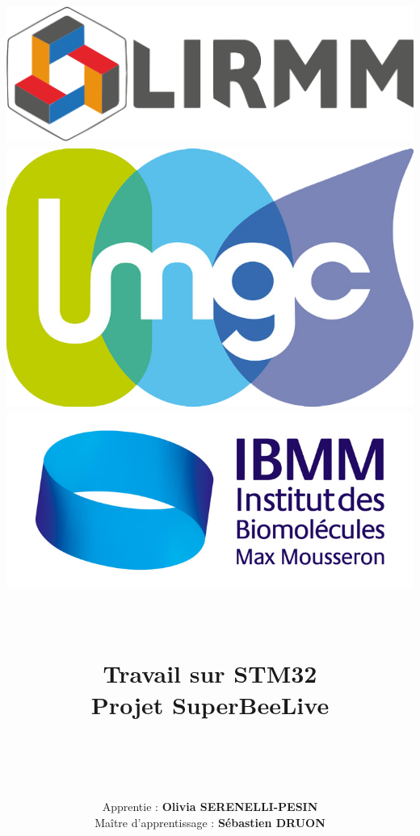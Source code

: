 \documentclass[11pt,french,a4paper]{report}
\begin{document}
\title{ 
    \includegraphics[scale=0.07]{./logo/logo_lirmm.png}  
    \includegraphics[scale=0.06]{./logo/logo_lmgc.png}
    \includegraphics[scale=0.4]{./logo/logo_IBMM.jpg}
    \hfill \\
    \hrulefill \\
    \hfill \\
    \LARGE \textbf{{Travail sur STM32\\ Projet SuperBeeLive}} \\
    \hrulefill \\
    \hfill \\
    }
\author{
    \large{Apprentie : \textbf{Olivia SERENELLI-PESIN}} \\
    \large{Maître d'apprentissage : \textbf{Sébastien DRUON}}
    \date{}
    }
\maketitle
\clearpage
\newpage
\tableofcontents
\end{document}
